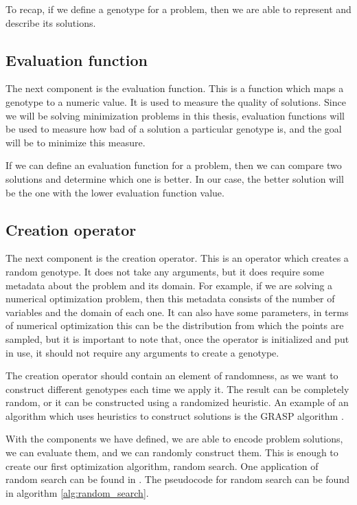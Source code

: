 To recap, if we define a genotype for a problem, then we are able to represent and describe its solutions.

\subsection{Evaluation function}
\label{sec:evaluation_function}

The next component is the evaluation function. This is a function which maps a genotype to a numeric value. It is used to measure the quality of solutions. Since we will be solving minimization problems in this thesis, evaluation functions will be used to measure how bad of a solution a particular genotype is, and the goal will be to minimize this measure.

If we can define an evaluation function for a problem, then we can compare two solutions and determine which one is better. In our case, the better solution will be the one with the lower evaluation function value.

\subsection{Creation operator}
\label{sec:creation_operator}

The next component is the creation operator. This is an operator which creates a random genotype. It does not take any arguments, but it does require some metadata about the problem and its domain. For example, if we are solving a numerical optimization problem, then this metadata consists of the number of variables and the domain of each one. It can also have some parameters, in terms of numerical optimization this can be the distribution from which the points are sampled, but it is important to note that, once the operator is initialized and put in use, it should not require any arguments to create a genotype.

The creation operator should contain an element of randomness, as we want to construct different genotypes each time we apply it. The result can be completely random, or it can be constructed using a randomized heuristic. An example of an algorithm which uses heuristics to construct solutions is the GRASP algorithm \citep{grasp}.

With the components we have defined, we are able to encode problem solutions, we can evaluate them, and we can randomly construct them. This is enough to create our first optimization algorithm, random search. One application of random search can be found in \citep{random_search}. The pseudocode for random search can be found in algorithm \ref{alg:random_search}.

